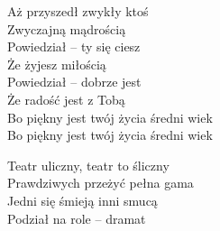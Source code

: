 \begin{text}
\begin{footTwelve}
    Aż przyszedł zwykły ktoś\\
    Zwyczajną mądrością\\
    Powiedział – ty się ciesz\\
    Że żyjesz miłością\\
    Powiedział – dobrze jest\\
    Że radość jest z Tobą\\
    Bo piękny jest twój życia średni wiek\\
    Bo piękny jest twój życia średni wiek

    Teatr uliczny, teatr to śliczny\\
    Prawdziwych przeżyć pełna gama\\
    Jedni się śmieją inni smucą\\
    Podział na role – dramat
\end{footTwelve}
\end{text}
\begin{chord}

\end{chord}